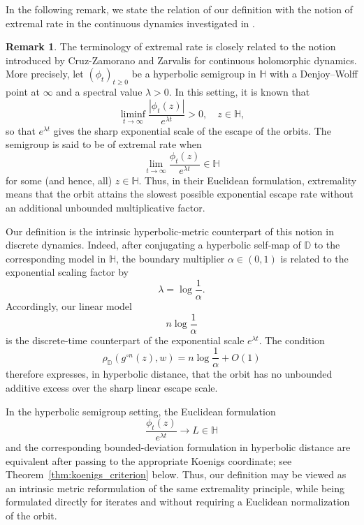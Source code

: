 \documentclass[12pt]{amsart}
\numberwithin{equation}{section}
\theoremstyle{plain}
\theoremstyle{definition}
\newtheorem{remark}[equation]{Remark}
\begin{document}
In the following remark, we state the relation of our definition with the notion of extremal rate in the continuous dynamics investigated in \cite{cruz26}.
\begin{remark}
\label{rem:continuous_extremal_rate}
The terminology of extremal rate is closely related to the notion introduced by Cruz-Zamorano and Zarvalis
\cite[Section~3.1]{cruz26} for continuous holomorphic dynamics.
More precisely, let $(\phi_t)_{t\geq0}$ be a hyperbolic semigroup in
$\mathbb{H}$ with a Denjoy--Wolff point at $\infty$ and a spectral value
$\lambda>0$. In this setting, it is known that
\begin{equation*}
\liminf_{t\to\infty}
\frac{|\phi_t(z)|}{e^{\lambda t}}>0,
\quad z\in\mathbb{H},
\end{equation*}
so that $e^{\lambda t}$ gives the sharp exponential scale of the escape of the orbits. The semigroup is said to be of extremal rate
when
\begin{equation*}
\lim_{t\to\infty}
\frac{\phi_t(z)}{e^{\lambda t}}
\in\mathbb{H}
\end{equation*}
for some (and hence, all) $z\in\mathbb{H}$.
Thus, in their Euclidean formulation, extremality means that the
orbit attains the slowest possible exponential escape rate without
an additional unbounded multiplicative factor.

Our definition is the intrinsic hyperbolic-metric counterpart of
this notion in discrete dynamics. Indeed, after conjugating a
hyperbolic self-map of $\mathbb{D}$ to the corresponding model in
$\mathbb{H}$, the boundary multiplier $\alpha\in(0,1)$ is related to
the exponential scaling factor by
\begin{equation*}
\lambda=\log\frac{1}{\alpha}.
\end{equation*}
Accordingly, our linear model
\begin{equation*}
n\log\frac{1}{\alpha}
\end{equation*}
is the discrete-time counterpart of the exponential scale
$e^{\lambda t}$. The condition
\begin{equation*}
\rho_{\mathbb{D}}(g^{\circ n}(z),w)
=
n\log\frac{1}{\alpha}+O(1)
\end{equation*}
therefore expresses, in hyperbolic distance, that the orbit has no
unbounded additive excess over the sharp linear escape scale.

In the hyperbolic semigroup setting, the Euclidean formulation
\begin{equation*}
\frac{\phi_t(z)}{e^{\lambda t}}\longrightarrow L\in\mathbb{H}
\end{equation*}
and the corresponding bounded-deviation formulation in hyperbolic distance are equivalent after passing to the appropriate Koenigs
coordinate; see Theorem~\ref{thm:koenigs_criterion} below. Thus, our definition may be viewed as an intrinsic metric reformulation of the
same extremality principle, while being formulated directly for
iterates and without requiring a Euclidean normalization of the
orbit.
\end{remark}
\end{document}
